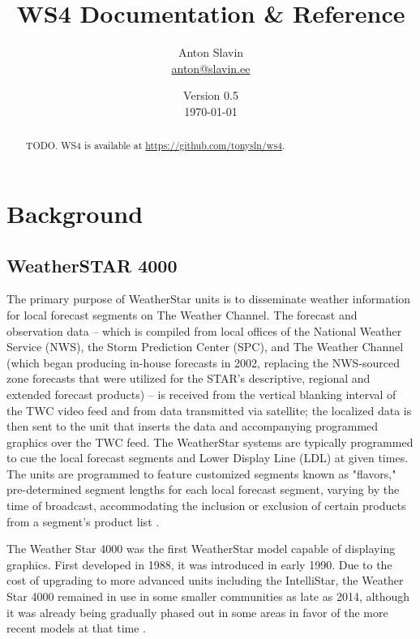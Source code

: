 \documentclass[a4paper,11pt]{refart}
\title{WS4 Documentation \& Reference}
\author{Anton Slavin\\\url{anton@slavin.ee}}
\date{Version 0.5\\\today}
\begin{document}
\maketitle

\begin{abstract}
TODO. WS4 is available at \url{https://github.com/tonysln/ws4}.
\end{abstract}

\tableofcontents
\clearpage



\section{Background}

\subsection{WeatherSTAR 4000}

The primary purpose of WeatherStar units is to disseminate weather information for local forecast segments on The Weather Channel. The forecast and observation data – which is compiled from local offices of the National Weather Service (NWS), the Storm Prediction Center (SPC), and The Weather Channel (which began producing in-house forecasts in 2002, replacing the NWS-sourced zone forecasts that were utilized for the STAR's descriptive, regional and extended forecast products) – is received from the vertical blanking interval of the TWC video feed and from data transmitted via satellite; the localized data is then sent to the unit that inserts the data and accompanying programmed graphics over the TWC feed. The WeatherStar systems are typically programmed to cue the local forecast segments and Lower Display Line (LDL) at given times. The units are programmed to feature customized segments known as "flavors," pre-determined segment lengths for each local forecast segment, varying by the time of broadcast, accommodating the inclusion or exclusion of certain products from a segment's product list \cite{WSWiki}. 

The Weather Star 4000 was the first WeatherStar model capable of displaying graphics. First developed in 1988, it was introduced in early 1990. Due to the cost of upgrading to more advanced units including the IntelliStar, the Weather Star 4000 remained in use in some smaller communities as late as 2014, although it was already being gradually phased out in some areas in favor of the more recent models at that time \cite{WSWiki}.
\end{document}

